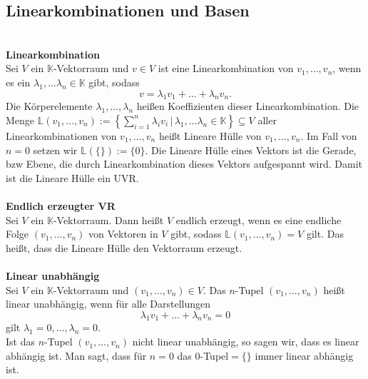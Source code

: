\documentclass[a4paper,12pt]{article}
\numberwithin{equation}{section}
\begin{document}
\subsection{Linearkombinationen und Basen}
\hfill\\\textbf{Linearkombination}\\ 
Sei $V$ ein $\mathbb{K}$-Vektorraum und $v \in V$ ist eine Linearkombination von $v_1,\hdots ,v_n$, wenn es ein $\lambda _1,\hdots \lambda _n  \in \mathbb{K}$ gibt, sodass
\[ 
        v=\lambda _1v_1+\hdots +\lambda _nv_n
.\] 
Die Körperelemente $\lambda _1,\hdots ,\lambda _n$ heißen Koeffizienten dieser Linearkombination. Die Menge $\mathbb{L}\left(v_1,\hdots ,v_n\right):=\left\{\sum_{i=1}^{n}\lambda _iv_i\,|\, \lambda _1,\hdots \lambda _n  \in \mathbb{K}\right\}\subseteq V$ aller Linearkombinationen von $v_1,\hdots ,v_n$ heißt Lineare Hülle von $v_1,\hdots ,v_n$. Im Fall von $n=0$ setzen wir $\mathbb{L}\left(\{\}\right):=\{0\}$. Die Lineare Hülle eines Vektors ist die Gerade, bzw Ebene, die durch Linearkombination dieses Vektors aufgespannt wird. Damit ist die Lineare Hülle ein UVR.
\\\hfill\\\textbf{Endlich erzeugter VR}\\ 
Sei $V$ ein $\mathbb{K}$-Vektorraum. Dann heißt $V$ endlich erzeugt, wenn es eine endliche Folge $\left(v_1,\hdots ,v_n\right)$ von Vektoren in $V$ gibt, sodass $\mathbb{L}\left(v_1,\hdots ,v_n\right)=V$ gilt. Das heißt, dass die Lineare Hülle den Vektorraum erzeugt.
\\\hfill\\\textbf{Linear unabhängig}\\ 
Sei $V$ ein $\mathbb{K}$-Vektorraum und $\left(v_1,\hdots ,v_n\right) \in V$. Das $n$-Tupel $\left(v_1,\hdots ,v_n\right)$ heißt linear unabhängig, wenn für alle Darstellungen
\[ 
        \lambda _1v_1+\hdots +\lambda _nv_n=0
\] 
gilt $\lambda _1=0,\hdots ,\lambda _n=0$.\\Ist das $n$-Tupel $\left(v_1,\hdots ,v_n\right)$ nicht linear unabhängig, so sagen wir, dass es linear abhängig ist. Man sagt, dass für $n=0$ das 0-Tupel$=\{\}$ immer linear abhängig ist.
\end{document}
